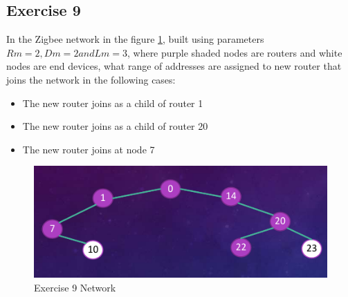 \subsection{Exercise 9}
In the Zigbee network in the figure \ref{e8-network}, built using
parameters $Rm=2, Dm=2 and Lm=3$, where purple
shaded nodes are routers and white nodes are end
devices, what range of addresses are assigned to
new router that joins the network in the following
cases:

\begin{itemize}
	\item  The new router joins as a child of router 1
	\item The new router joins as a child of router 20
	\item  The new router joins at node 7
\end{itemize}

\begin{figure}[h]
	\centering\includegraphics[scale=0.50]{images/Pasted image 20230601100433.png}
	\caption{Exercise 9 Network}
	\label{e8-network}
\end{figure}







